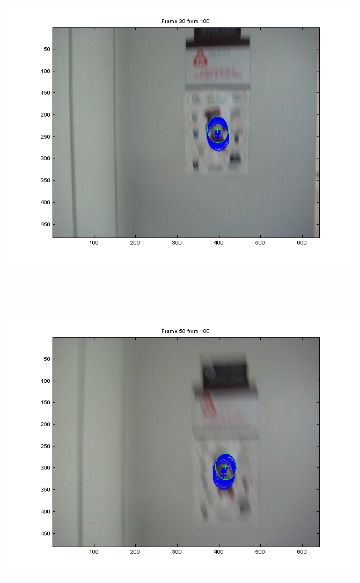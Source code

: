 \documentclass[hyperref={pdfpagelabels=false}]{beamer}
\begin{document}
\begin{frame}
\begin{figure}
\begin{subfigure}[b]{0.3\textwidth}
                 \includegraphics[width=\textwidth]{results/owl/Frame0030.png}
         \end{subfigure}
         \\
         \begin{subfigure}[b]{0.3\textwidth}
                 \includegraphics[width=\textwidth]{results/owl/Frame0050.png}
         \end{subfigure}
         \begin{subfigure}[b]{0.3\textwidth}

\end{subfigure}
\end{figure}
\end{frame}
\end{document}
